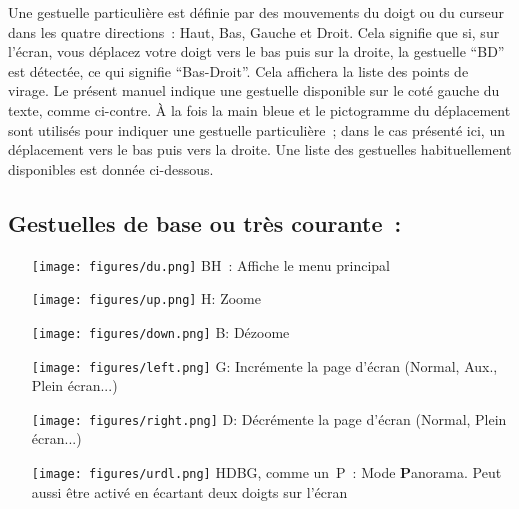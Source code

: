 Une gestuelle particulière est définie par des mouvements du doigt ou du
curseur dans les quatre directions~: Haut, Bas, Gauche et Droit. Cela signifie que si,
sur l'écran, vous déplacez votre doigt vers le bas puis sur la droite, 
 la gestuelle ``BD'' est détectée, ce qui signifie ``Bas-Droit''.
Cela affichera la liste des points de virage. Le présent manuel indique une gestuelle
disponible sur le coté gauche du texte, comme ci-contre. À la fois la main bleue
et le pictogramme du déplacement sont utilisés pour indiquer une gestuelle particulière~;
dans le cas présenté ici, un déplacement vers le bas puis vers la droite.
Une liste des gestuelles habituellement disponibles est donnée ci-dessous.
\vspace{2em}

\subsection*{Gestuelles de base ou très courante~:}
\begin{itemize}
\item[\raisebox{-1em}
{\texttt{[image: figures/du.png]}}] BH~: Affiche le menu principal
\item[\raisebox{-1em}
{\texttt{[image: figures/up.png]}}] H: Zoome
\item[\raisebox{-1em}
{\texttt{[image: figures/down.png]}}] B: Dézoome
\item[\raisebox{-1em}
{\texttt{[image: figures/left.png]}}] G: Incrémente la page d'écran (Normal, Aux., Plein écran...) 
\item[\raisebox{-1em}
{\texttt{[image: figures/right.png]}}] D: Décrémente la page d'écran (Normal, Plein écran...) 
\item[\raisebox{-1em}
{\texttt{[image: figures/urdl.png]}}] HDBG, comme un~P~: Mode \textbf{P}anorama. Peut aussi être activé en écartant deux doigts sur l'écran
\end{itemize}
\vspace{2em}

